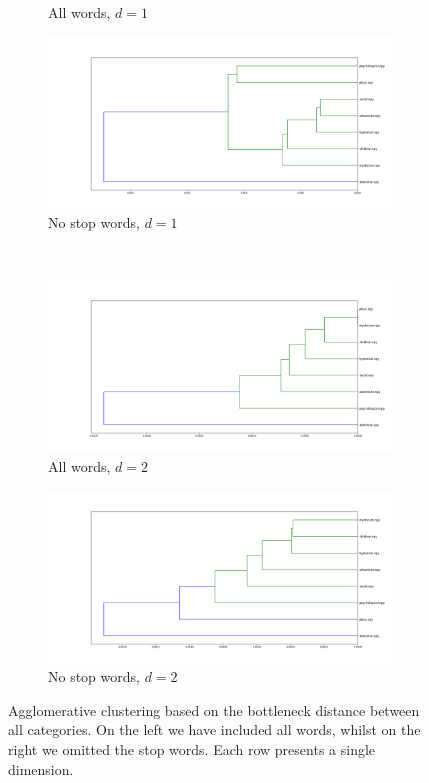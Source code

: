 \documentclass[fleqn]{article}
\begin{document}
\begin{figure}
\begin{subfigure}[t]{0.475\textwidth}
			\caption{All words, $d =1$}
			\label{fig:all:d1}
		\end{subfigure}\hfill
		\begin{subfigure}[t]{0.475\textwidth}
			\includegraphics[width=\textwidth]{figures/stopwords_excluded/dendrogram_d1.png}
			\caption{No stop words, $d = 1$}
			\label{fig:sw:d1}
		\end{subfigure}\hfill
		\\
		\begin{subfigure}[t]{0.475\textwidth}
			\includegraphics[width=\textwidth]{figures/all_words/dendrogram_d2.png}
			\caption{All words, $d = 2$}
			\label{fig:all:d2}
		\end{subfigure}\hfill
		\begin{subfigure}[t]{0.475\textwidth}
			\includegraphics[width=\textwidth]{figures/stopwords_excluded/dendrogram_d2.png}
			\caption{No stop words, $d = 2$}
			\label{fig:sw:d2}
		\end{subfigure}\hfill
		\caption{Agglomerative clustering based on the bottleneck distance between all categories. On the left we have included all words, whilst on the right we omitted the stop words. Each row presents a single dimension.}
		\label{fig:dendro}
	\end{figure}
	
	
	
	
\end{document}
